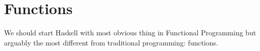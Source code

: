 \chapter{Functions}
We should start Haskell with most obvious thing in Functional Programming but arguably the most different from traditional programming: functions. 
